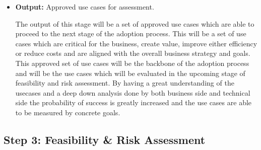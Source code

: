 \documentclass[]{imc-inf}
\begin{document}
\begin{itemize}
	The decision point whether to proceed, iterate or abandon the
	strategic alignment review stage will be based on the question ``Does
	this initiative align with corporate strategy and transformation
	goals?''. The question needs to be asked with the mind of not only the
	business value and strategy but also the technical feasibility and the
	actual impact which the engineers estimated. After the analysis is
	done, the concrete numbers of efficiency gains, time savings and daily
	work impact will be used to evaluate the use case and the impact
	leaving on the organisation and its internal processes
	\item
	\textbf{Output:} Approved use cases for assessment.
	
	The output of this stage will be a set of approved use cases which are
	able to proceed to the next stage of the adoption process. This will
	be a set of use cases which are critical for the business, create
	value, improve either efficiency or reduce costs and are aligned with
	the overall business strategy and goals. This approved set of use
	cases will be the backbone of the adoption process and will be the use
	cases which will be evaluated in the upcoming stage of feasibility and
	risk assessment. By having a great understanding of the usecases and a
	deep down analysis done by both business side and technical side the
	probability of success is greatly increased and the use cases are able
	to be measured by concrete goals.
\end{itemize}

\subsection{Step 3: Feasibility \& Risk
	Assessment}\label{step-3-feasibility-risk-assessment}
\end{document}
